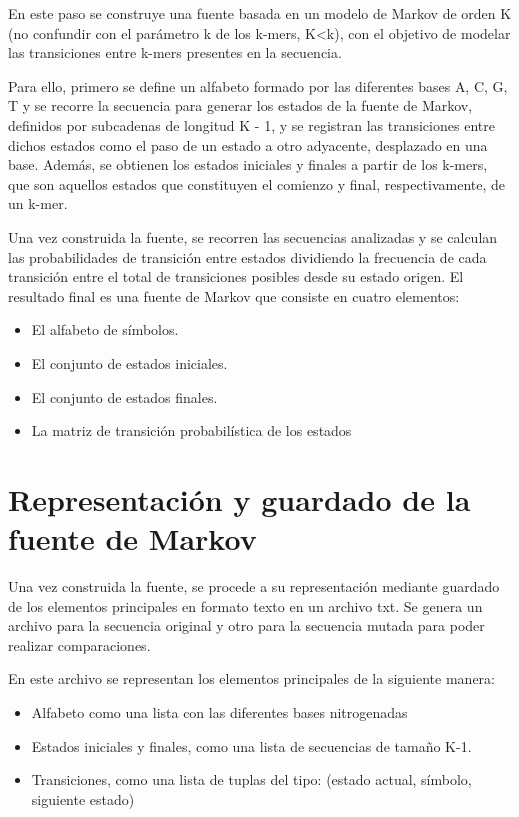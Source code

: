 \documentclass[11pt,spanish,listoffigures,listoftables]{tfgetsinf}
\begin{document}
En este paso se construye una fuente basada en un modelo de Markov de orden K (no confundir con el parámetro k de los k-mers, K<k), con el objetivo de modelar las transiciones entre k-mers presentes en la secuencia. 

Para ello, primero se define un alfabeto formado por las diferentes bases {A, C, G, T} y se recorre la secuencia para generar los estados de la fuente de Markov, definidos por subcadenas de longitud K - 1, y se registran las transiciones entre dichos estados como el paso de un estado a otro adyacente, desplazado en una base. Además, se obtienen los estados iniciales y finales a partir de los k-mers, que son aquellos estados que constituyen el comienzo y final, respectivamente, de un k-mer.  

Una vez construida la fuente, se recorren las secuencias analizadas y se calculan las probabilidades de transición entre estados dividiendo la frecuencia de cada transición entre el total de transiciones posibles desde su estado origen. El resultado final es una fuente de Markov que consiste en cuatro elementos:  


\begin{itemize}
   \item El alfabeto de símbolos.
   \item El conjunto de estados iniciales.  
   \item El conjunto de estados finales. 
   \item La matriz de transición probabilística de los estados 
\end{itemize}

\section{Representación y guardado de la fuente de Markov}

Una vez construida la fuente, se procede a su representación mediante guardado de los elementos principales en formato texto en un archivo txt. Se genera un archivo para la secuencia original y otro para la secuencia mutada para poder realizar comparaciones. 

En este archivo se representan los elementos principales de la siguiente manera: 

\begin{itemize}
   \item Alfabeto como una lista con las diferentes bases nitrogenadas 
   \item Estados iniciales y finales, como una lista de secuencias de tamaño K-1.
   \item Transiciones, como una lista de tuplas del tipo: (estado actual, símbolo, siguiente estado)
\end{itemize}
\end{document}
